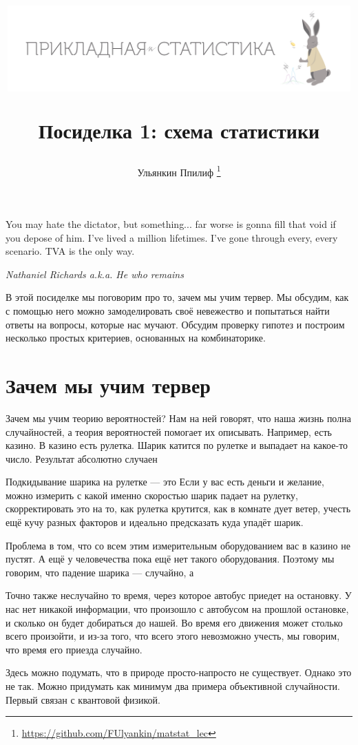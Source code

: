 \documentclass[12pt, a4paper, oneside]{article}
\title{
\begin{center} 
\includegraphics[width=0.99\textwidth]{logo.png}
\end{center}

Посиделка 1: схема статистики}
\date{ } %
\author{Ульянкин Ппилиф \thanks{\url{https://github.com/FUlyankin/matstat_lec}}}
\begin{document}

\maketitle

\epigraph{You may hate the dictator, but something... far worse is gonna fill that void if you depose of him. I've lived a million lifetimes. I've gone through every, every scenario. TVA is the only way.}{\textit{Nathaniel Richards a.k.a. He who remains}}


В этой посиделке мы поговорим про то, зачем мы учим тервер. Мы обсудим, как с помощью него можно замоделировать своё невежество и попытаться найти ответы на вопросы, которые нас мучают. Обсудим проверку гипотез и построим несколько простых критериев, основанных на комбинаторике. 

\section{Зачем мы учим тервер}

Зачем мы учим теорию вероятностей? Нам на ней говорят, что наша жизнь полна случайностей, а теория вероятностей помогает их описывать. Например, есть казино. В казино есть рулетка. Шарик катится по рулетке и выпадает на какое-то число. Результат абсолютно случаен  

Подкидывание шарика на рулетке --- это  Если у вас есть деньги и желание, можно измерить с какой именно скоростью шарик падает на рулетку, скорректировать это на то, как рулетка крутится, как в комнате дует ветер, учесть ещё кучу разных факторов и идеально предсказать куда упадёт шарик. 

Проблема в том, что со всем этим измерительным оборудованием вас в казино не пустят. А ещё у человечества пока ещё нет такого оборудования. Поэтому мы говорим, что падение шарика --- случайно, а 

Точно также неслучайно то время, через которое автобус приедет на остановку. У нас нет никакой информации, что произошло с автобусом  на прошлой остановке, и сколько он будет добираться до нашей. Во время его движения может столько всего произойти, и из-за того, что всего этого невозможно учесть, мы говорим, что время его приезда случайно. 

Здесь можно подумать, что  в природе просто-напросто не существует. Однако это не так. Можно придумать как минимум два примера объективной случайности. Первый связан с квантовой физикой.  
\end{document}
